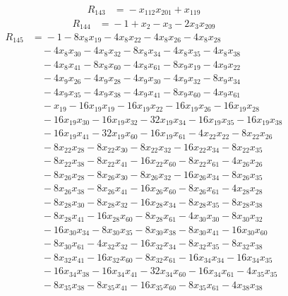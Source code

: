 \begin{align*}
R_{143}&={}-x_{112}x_{201} +x_{119}
\end{align*}
\begin{align*}
R_{144}&={}-1 +x_{2} -x_{3} -2x_{3}x_{209}
\end{align*}
\begin{align*}
R_{145}&={}-1 -8x_{8}x_{19} -4x_{8}x_{22} -4x_{8}x_{26} -4x_{8}x_{28}\\
&\quad{}-4x_{8}x_{30} -4x_{8}x_{32} -8x_{8}x_{34} -4x_{8}x_{35} -4x_{8}x_{38}\\
&\quad{}-4x_{8}x_{41} -8x_{8}x_{60} -4x_{8}x_{61} -8x_{9}x_{19} -4x_{9}x_{22}\\
&\quad{}-4x_{9}x_{26} -4x_{9}x_{28} -4x_{9}x_{30} -4x_{9}x_{32} -8x_{9}x_{34}\\
&\quad{}-4x_{9}x_{35} -4x_{9}x_{38} -4x_{9}x_{41} -8x_{9}x_{60} -4x_{9}x_{61}\\
&\quad{}-x_{19} -16x_{19}x_{19} -16x_{19}x_{22} -16x_{19}x_{26} -16x_{19}x_{28}\\
&\quad{}-16x_{19}x_{30} -16x_{19}x_{32} -32x_{19}x_{34} -16x_{19}x_{35} -16x_{19}x_{38}\\
&\quad{}-16x_{19}x_{41} -32x_{19}x_{60} -16x_{19}x_{61} -4x_{22}x_{22} -8x_{22}x_{26}\\
&\quad{}-8x_{22}x_{28} -8x_{22}x_{30} -8x_{22}x_{32} -16x_{22}x_{34} -8x_{22}x_{35}\\
&\quad{}-8x_{22}x_{38} -8x_{22}x_{41} -16x_{22}x_{60} -8x_{22}x_{61} -4x_{26}x_{26}\\
&\quad{}-8x_{26}x_{28} -8x_{26}x_{30} -8x_{26}x_{32} -16x_{26}x_{34} -8x_{26}x_{35}\\
&\quad{}-8x_{26}x_{38} -8x_{26}x_{41} -16x_{26}x_{60} -8x_{26}x_{61} -4x_{28}x_{28}\\
&\quad{}-8x_{28}x_{30} -8x_{28}x_{32} -16x_{28}x_{34} -8x_{28}x_{35} -8x_{28}x_{38}\\
&\quad{}-8x_{28}x_{41} -16x_{28}x_{60} -8x_{28}x_{61} -4x_{30}x_{30} -8x_{30}x_{32}\\
&\quad{}-16x_{30}x_{34} -8x_{30}x_{35} -8x_{30}x_{38} -8x_{30}x_{41} -16x_{30}x_{60}\\
&\quad{}-8x_{30}x_{61} -4x_{32}x_{32} -16x_{32}x_{34} -8x_{32}x_{35} -8x_{32}x_{38}\\
&\quad{}-8x_{32}x_{41} -16x_{32}x_{60} -8x_{32}x_{61} -16x_{34}x_{34} -16x_{34}x_{35}\\
&\quad{}-16x_{34}x_{38} -16x_{34}x_{41} -32x_{34}x_{60} -16x_{34}x_{61} -4x_{35}x_{35}\\
&\quad{}-8x_{35}x_{38} -8x_{35}x_{41} -16x_{35}x_{60} -8x_{35}x_{61} -4x_{38}x_{38}\\

\end{align*}
